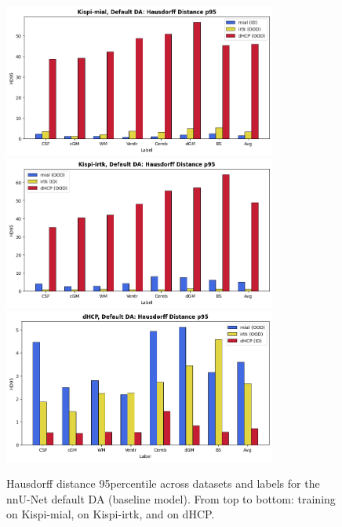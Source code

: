 \begin{figure}[htbp]
    \centering
    \includegraphics[width=0.8\textwidth]{figures/mial_default_HD.png}\\
    \vspace{2pt}
    \includegraphics[width=0.8\textwidth]{figures/irtk_default_HD.png}\\
    \vspace{2pt}
    \includegraphics[width=0.8\textwidth]{figures/dHCP_default_HD.png}
    \caption{Hausdorff distance 95\th percentile across datasets and labels for the nnU-Net default DA (baseline model). From top to bottom: training on Kispi-mial, on Kispi-irtk, and on dHCP.}
    \label{fig:default_HD}
\end{figure}

